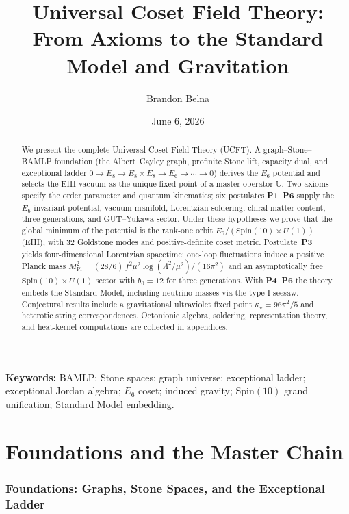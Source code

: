 \documentclass[11pt]{article}
\title{Universal Coset Field Theory:\\[0.4em]
\large From Axioms to the Standard Model and Gravitation}
\author{Brandon Belna}
\date{June 6, 2026}
\theoremstyle{plain}
\theoremstyle{definition}
\theoremstyle{remark}
\begin{document}
\maketitle

\begin{abstract}
We present the complete Universal Coset Field Theory (UCFT). A graph--Stone--BAMLP
foundation (the Albert--Cayley graph, profinite Stone lift, capacity dual, and
exceptional ladder $0\to E_8\to E_8\times E_8\to E_6\to\cdots\to 0$) derives the
$E_6$ potential and selects the EIII vacuum as the unique fixed point of a
master operator $\mathbb{U}$. Two axioms specify the
order parameter and quantum kinematics; six postulates \textbf{P1--P6} supply the
$E_6$-invariant potential, vacuum manifold, Lorentzian soldering, chiral matter
content, three generations, and GUT--Yukawa sector. Under these hypotheses we
prove that the global minimum of the potential is the rank-one orbit
$E_6/(\mathrm{Spin}(10)\times U(1))$ (EIII), with $32$ Goldstone modes and
positive-definite coset metric. Postulate~\textbf{P3} yields four-dimensional
Lorentzian spacetime; one-loop fluctuations induce a positive Planck mass
$M_{\mathrm{Pl}}^2=(28/6)\,f^2\mu^2\log(\Lambda^2/\mu^2)/(16\pi^2)$ and an
asymptotically free $\mathrm{Spin}(10)\times U(1)$ sector with
$b_0=12$ for three generations. With \textbf{P4--P6} the theory embeds the
Standard Model, including neutrino masses via the type-I seesaw. Conjectural
results include a gravitational ultraviolet fixed point
$\kappa_\star=96\pi^2/5$ and heterotic string correspondences. Octonionic
algebra, soldering, representation theory, and heat-kernel computations are
collected in appendices.
\end{abstract}

\noindent\textbf{Keywords:}
BAMLP; Stone spaces; graph universe; exceptional ladder; exceptional Jordan
algebra; $E_6$ coset; induced gravity; $\mathrm{Spin}(10)$ grand unification;
Standard Model embedding.

\tableofcontents
\clearpage
\part{Foundations and the Master Chain}
\section{Foundations: Graphs, Stone Spaces, and the Exceptional Ladder}
\label{sec:bamlp:main}
\end{document}
